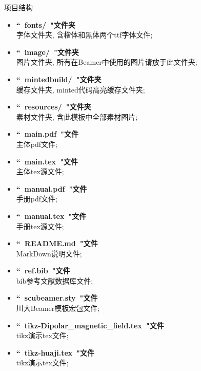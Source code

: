 \documentclass[hyperref,UTF8,11pt,CJK]{beamer}
\begin{document}
\begin{frame}{项目结构}
	\scriptsize
	\begin{multicols}{2}
	\begin{itemize}
		\item \textbf{``~fonts/~"\hfill 文件夹}\\字体文件夹, 含楷体和黑体两个ttf字体文件;
		\item \textbf{``~image/~"\hfill 文件夹}\\图片文件夹, 所有在Beamer中使用的图片请放于此文件夹;
		\item \textbf{``~mintedbuild/~"\hfill 文件夹}\\缓存文件夹, minted代码高亮缓存文件夹;
		\item \textbf{``~resources/~"\hfill 文件夹}\\素材文件夹, 含此模板中全部素材图片;
		\item \textbf{``~main.pdf~"\hfill 文件}\\主体pdf文件;
		\item \textbf{``~main.tex~"\hfill 文件}\\主体tex源文件;
		\item \textbf{``~manual.pdf~"\hfill 文件}\\手册pdf文件;
		\item \textbf{``~manual.tex~"\hfill 文件}\\手册tex源文件;
		\item \textbf{``~README.md~"\hfill 文件}\\MarkDown说明文件;
		\item \textbf{``~ref.bib~"\hfill 文件}\\bib参考文献数据库文件;
		\item \textbf{``~scubeamer.sty~"\hfill 文件}\\川大Beamer模板宏包文件;
		\item \textbf{``~tikz-Dipolar\_magnetic\_field.tex~"\hfill 文件}\\tikz演示tex文件;
		\item \textbf{``~tikz-huaji.tex~"\hfill 文件}\\tikz演示tex文件;
	\end{itemize}
	\end{multicols}
\end{frame}
\end{document}
